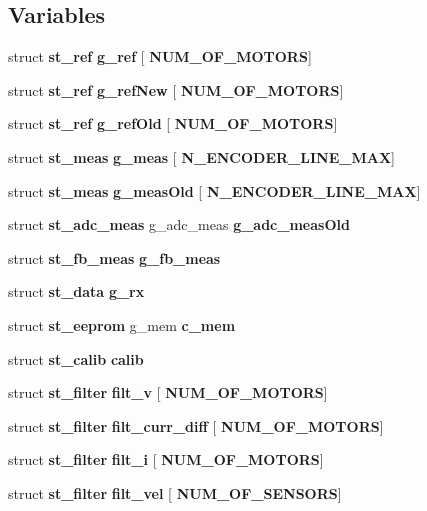\subsection*{Variables}
\begin{DoxyCompactItemize}
\item 
\mbox{\label{globals_8h_a975e5cde4f157d8bbdbde3c03227f3de}} 
struct \textbf{ st\+\_\+ref} {\bfseries g\+\_\+ref} [\textbf{ N\+U\+M\+\_\+\+O\+F\+\_\+\+M\+O\+T\+O\+RS}]
\item 
\mbox{\label{globals_8h_ab40c607c340b011a96046994f4b2229c}} 
struct \textbf{ st\+\_\+ref} {\bfseries g\+\_\+ref\+New} [\textbf{ N\+U\+M\+\_\+\+O\+F\+\_\+\+M\+O\+T\+O\+RS}]
\item 
struct \textbf{ st\+\_\+ref} \textbf{ g\+\_\+ref\+Old} [\textbf{ N\+U\+M\+\_\+\+O\+F\+\_\+\+M\+O\+T\+O\+RS}]
\item 
\mbox{\label{globals_8h_a6f0c00c1300c30d398231d1e76f3f780}} 
struct \textbf{ st\+\_\+meas} {\bfseries g\+\_\+meas} [\textbf{ N\+\_\+\+E\+N\+C\+O\+D\+E\+R\+\_\+\+L\+I\+N\+E\+\_\+\+M\+AX}]
\item 
struct \textbf{ st\+\_\+meas} \textbf{ g\+\_\+meas\+Old} [\textbf{ N\+\_\+\+E\+N\+C\+O\+D\+E\+R\+\_\+\+L\+I\+N\+E\+\_\+\+M\+AX}]
\item 
struct \textbf{ st\+\_\+adc\+\_\+meas} g\+\_\+adc\+\_\+meas \textbf{ g\+\_\+adc\+\_\+meas\+Old}
\item 
struct \textbf{ st\+\_\+fb\+\_\+meas} \textbf{ g\+\_\+fb\+\_\+meas}
\item 
struct \textbf{ st\+\_\+data} \textbf{ g\+\_\+rx}
\item 
struct \textbf{ st\+\_\+eeprom} g\+\_\+mem \textbf{ c\+\_\+mem}
\item 
struct \textbf{ st\+\_\+calib} \textbf{ calib}
\item 
\mbox{\label{globals_8h_a0e9a576515332f8bd83ae6a2fe0164aa}} 
struct \textbf{ st\+\_\+filter} {\bfseries filt\+\_\+v} [\textbf{ N\+U\+M\+\_\+\+O\+F\+\_\+\+M\+O\+T\+O\+RS}]
\item 
\mbox{\label{globals_8h_a503852d956ef1e03f4a9d8b91db248fc}} 
struct \textbf{ st\+\_\+filter} {\bfseries filt\+\_\+curr\+\_\+diff} [\textbf{ N\+U\+M\+\_\+\+O\+F\+\_\+\+M\+O\+T\+O\+RS}]
\item 
struct \textbf{ st\+\_\+filter} \textbf{ filt\+\_\+i} [\textbf{ N\+U\+M\+\_\+\+O\+F\+\_\+\+M\+O\+T\+O\+RS}]
\item 
struct \textbf{ st\+\_\+filter} \textbf{ filt\+\_\+vel} [\textbf{ N\+U\+M\+\_\+\+O\+F\+\_\+\+S\+E\+N\+S\+O\+RS}]
\item 

\end{DoxyCompactItemize}
